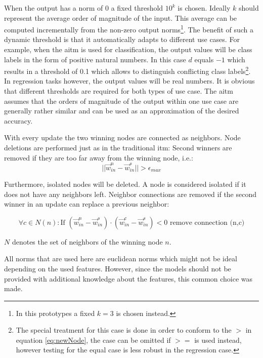 When the output has a norm of $0$ a fixed threshold $10^k$ is chosen. Ideally $k$ should represent the average order of magnitude of the input. This average can be computed incrementally from the non-zero output norms\footnote{In this prototypes a fixed $k=3$ is chosen instead.}. The benefit of such a dynamic threshold is that it automatically adapts to different use cases. For example, when the \gls{aitm} is used for classification, the output values will be class labels in the form of positive natural numbers. In this case $d$ equals $-1$ which results in a threshold of 0.1 which allows to distinguish conflicting class labels\footnote{The special treatment for this case is done in order to conform to the $>$ in equation \ref{eq:newNode}, the case can be omitted if $>=$ is used instead, however testing for the equal case is less robust in the regression case.}.
In regression tasks however, the output values will be real numbers. It is obvious that different thresholds are required for both types of use case. The \gls{aitm} assumes that the orders of magnitude of the output within one use case are generally rather similar and can be used as an approximation of the desired accuracy.

With every update the two winning nodes are connected as neighbors. Node deletions are performed just as in the traditional \gls{itm}: Second winners are removed if they are too far away from the winning node, i.e.:
\begin{equation}
||\vec{w}^n_{in} - \vec{w}^s_{in}|| > \epsilon_{max}
\end{equation}

Furthermore, isolated nodes will be deleted. A node is considered isolated if it does not have any neighbors left. Neighbor connections are removed if the second winner in an update can replace a previous neighbor:

\begin{equation}
\forall c \in N(n): \text{If~} (\vec{w}^n_{in}-\vec{w}^s_{in}) \cdot (\vec{w}^c_{in}-\vec{w}^s_{in}) < 0 \text{~remove connection (n,c)}
\end{equation}

$N$ denotes the set of neighbors of the winning node $n$.

All norms that are used here are euclidean norms which might not be ideal depending on the used features. However, since the models should not be provided with additional knowledge about the features, this common choice was made.

